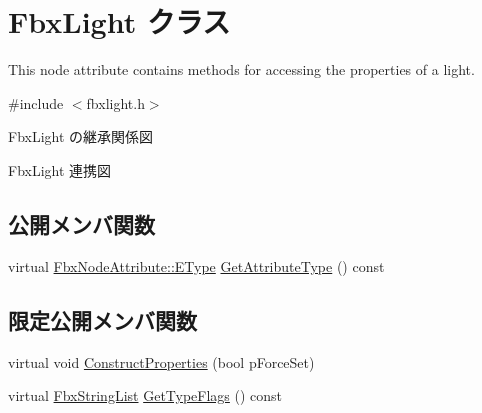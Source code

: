\hypertarget{class_fbx_light}{}\section{Fbx\+Light クラス}
\label{class_fbx_light}


This node attribute contains methods for accessing the properties of a light.  




{\ttfamily \#include $<$fbxlight.\+h$>$}



Fbx\+Light の継承関係図


Fbx\+Light 連携図
\subsection*{公開メンバ関数}
\begin{DoxyCompactItemize}
\item 
virtual \hyperlink{class_fbx_node_attribute_a08e1669d3d1a696910756ab17de56d6a}{Fbx\+Node\+Attribute\+::\+E\+Type} \hyperlink{class_fbx_light_a0a0ef9dd3eacb2cadb30416d13ea8e7d}{Get\+Attribute\+Type} () const
\end{DoxyCompactItemize}
\subsection*{限定公開メンバ関数}
\begin{DoxyCompactItemize}
\item 
virtual void \hyperlink{class_fbx_light_aaa406a871272d3f36c6300ab81f312c5}{Construct\+Properties} (bool p\+Force\+Set)
\item 
virtual \hyperlink{class_fbx_string_list}{Fbx\+String\+List} \hyperlink{class_fbx_light_a962256338837265748540bd0b3d9b511}{Get\+Type\+Flags} () const
\end{DoxyCompactItemize}
